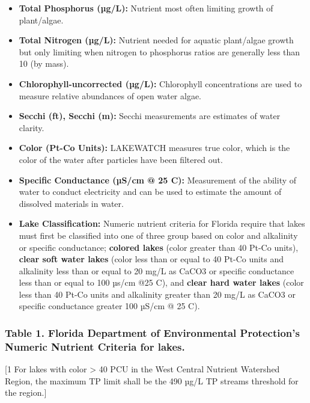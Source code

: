 \documentclass[
]{article}
\providecommand{\tightlist}{%
  \setlength{\itemsep}{0pt}\setlength{\parskip}{0pt}}
\begin{document}
\begin{itemize}
\tightlist
\item
  \textbf{Total Phosphorus (µg/L):} Nutrient most often limiting growth
  of plant/algae.
\item
  \textbf{Total Nitrogen (µg/L):} Nutrient needed for aquatic
  plant/algae growth but only limiting when nitrogen to phosphorus
  ratios are generally less than 10 (by mass).
\item
  \textbf{Chlorophyll-uncorrected (µg/L):} Chlorophyll concentrations
  are used to measure relative abundances of open water algae.
\item
  \textbf{Secchi (ft), Secchi (m):} Secchi measurements are estimates of
  water clarity.
\item
  \textbf{Color (Pt-Co Units):} LAKEWATCH measures true color, which is
  the color of the water after particles have been filtered out.
\item
  \textbf{Specific Conductance (µS/cm @ 25 C):} Measurement of the
  ability of water to conduct electricity and can be used to estimate
  the amount of dissolved materials in water.
\item
  \textbf{Lake Classification:} Numeric nutrient criteria for Florida
  require that lakes must first be classified into one of three group
  based on color and alkalinity or specific conductance; \textbf{colored
  lakes} (color greater than 40 Pt-Co units), \textbf{clear soft water
  lakes} (color less than or equal to 40 Pt-Co units and alkalinity less
  than or equal to 20 mg/L as CaCO3 or specific conductance less than or
  equal to 100 µs/cm @25 C), and \textbf{clear hard water lakes} (color
  less than 40 Pt-Co units and alkalinity greater than 20 mg/L as CaCO3
  or specific conductance greater 100 µS/cm @ 25 C).
\end{itemize}

\hypertarget{table-1.-florida-department-of-environmental-protections-numeric-nutrient-criteria-for-lakes.}{%
\subsubsection{Table 1. Florida Department of Environmental Protection's
Numeric Nutrient Criteria for
lakes.}\label{table-1.-florida-department-of-environmental-protections-numeric-nutrient-criteria-for-lakes.}}

{[}1 For lakes with color \textgreater{} 40 PCU in the West Central
Nutrient Watershed Region, the maximum TP limit shall be the 490 µg/L TP
streams threshold for the region.{]}
\end{document}
